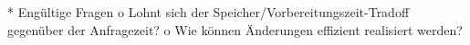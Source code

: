     * Engültige Fragen
          o Lohnt sich der Speicher/Vorbereitungszeit-Tradoff gegenüber der Anfragezeit?
          o Wie können Änderungen effizient realisiert werden? 